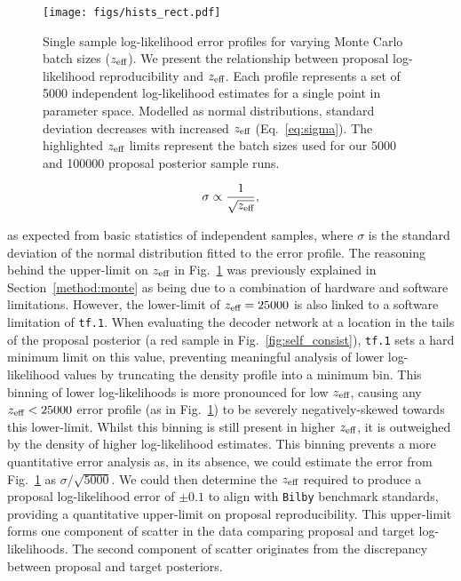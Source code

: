 \documentclass[a4paper]{jpconf}
\begin{document}
\begin{figure}
	\centering
	\texttt{[image: figs/hists\_rect.pdf]}
	\caption{Single sample log-likelihood error profiles for varying Monte Carlo batch sizes ($z_\textup{eff}$). We present the relationship between proposal log-likelihood reproducibility and $z_\textup{eff}$. Each profile represents a set of 5000 independent log-likelihood estimates for a single point in parameter space. Modelled as normal distributions, standard deviation decreases with increased $z_\textup{eff}$ (Eq.~\ref{eq:sigma}). The highlighted $z_\textup{eff}$ limits represent the batch sizes used for our 5000 and 100000 proposal posterior sample runs.}
	\label{fig:hists}
\end{figure}

\begin{align}\label{eq:sigma}
\sigma \propto \frac{1}{\sqrt{z_\textup{eff}}},
\end{align}

as expected from basic statistics of independent samples, where $\sigma$ is the standard deviation of the normal distribution fitted to the error profile. The reasoning behind the upper-limit on $z_\textup{eff}$ in Fig.~\ref{fig:hists} was previously explained in Section~\ref{method:monte} as being due to a combination of hardware and software limitations. However, the lower-limit of $z_\textup{eff}=25000$ is also linked to a software limitation of \texttt{tf.1}. When evaluating the decoder network at a location in the tails of the proposal posterior (a red sample in Fig.~\ref{fig:self_consist}), \texttt{tf.1} sets a hard minimum limit on this value, preventing meaningful analysis of lower log-likelihood values by truncating the density profile into a minimum bin. This binning of lower log-likelihoods is more pronounced for low $z_\textup{eff}$, causing any $z_\textup{eff}<25000$ error profile (as in Fig.~\ref{fig:hists}) to be severely negatively-skewed towards this lower-limit. Whilst this binning is still present in higher $z_\textup{eff}$, it is outweighed by the density of higher log-likelihood estimates. This binning prevents a more quantitative error analysis as, in its absence, we could estimate the error from Fig.~\ref{fig:hists} as $\sigma/\sqrt{5000}$. We could then determine the $z_\textup{eff}$ required to produce a proposal log-likelihood error of $\pm0.1$ to align with \texttt{Bilby} benchmark standards, providing a quantitative upper-limit on proposal reproducibility. This upper-limit forms one component of scatter in the data comparing proposal and target log-likelihoods. The second component of scatter originates from the discrepancy between proposal and target posteriors.
\end{document}
